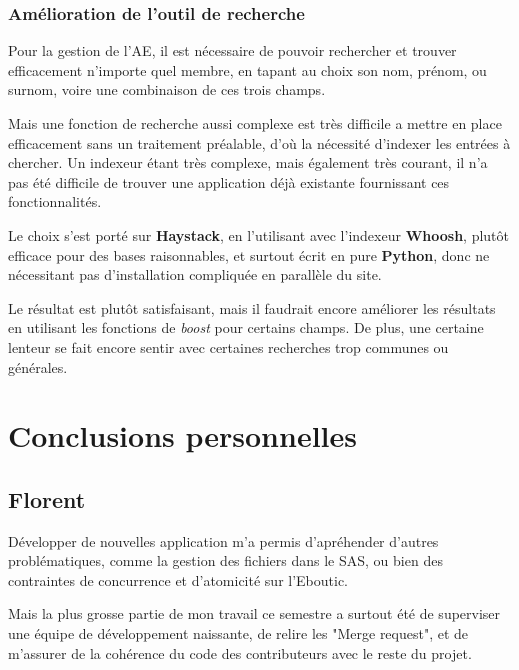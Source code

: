 \documentclass[a4paper]{report}
\begin{document}
\subsection{Amélioration de l'outil de recherche}
\label{sub:amelioration_de_l_outil_de_recherche}
\par Pour la gestion de l'AE, il est nécessaire de pouvoir rechercher et trouver efficacement n'importe quel membre, en
tapant au choix son nom, prénom, ou surnom, voire une combinaison de ces trois champs.

\par Mais une fonction de recherche aussi complexe est très difficile a mettre en place efficacement sans un traitement
préalable, d'où la nécessité d'indexer les entrées à chercher. Un indexeur étant très complexe, mais également très
courant, il n'a pas été difficile de trouver une application déjà existante fournissant ces fonctionnalités.

\par Le choix s'est porté sur \textbf{Haystack}, en l'utilisant avec l'indexeur \textbf{Whoosh}, plutôt efficace pour
des bases raisonnables, et surtout écrit en pure \textbf{Python}, donc ne nécessitant pas d'installation compliquée en
parallèle du site.

\par Le résultat est plutôt satisfaisant, mais il faudrait encore améliorer les résultats en utilisant les fonctions de
\emph{boost} pour certains champs. De plus, une certaine lenteur se fait encore sentir avec certaines recherches trop
communes ou générales.


\chapter{Conclusions personnelles}
\section{Florent}
\label{sec:skia}
\par Développer de nouvelles application m'a permis d'apréhender d'autres problématiques, comme la gestion des fichiers
dans le SAS, ou bien des contraintes de concurrence et d'atomicité sur l'Eboutic.

\par Mais la plus grosse partie de mon travail ce semestre a surtout été de superviser une équipe de développement
naissante, de relire les "Merge request", et de m'assurer de la cohérence du code des contributeurs avec le reste du
projet.
\end{document}
